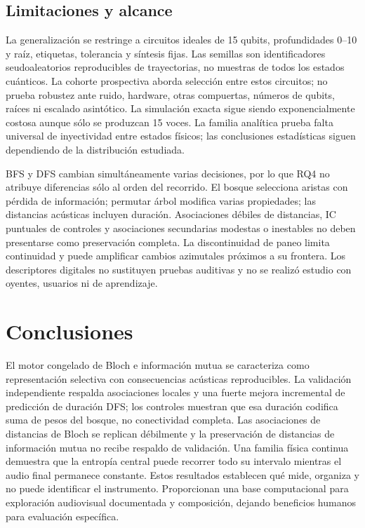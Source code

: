 \documentclass[pdflatex,iicol,sn-basic,Numbered]{sn-jnl}
\begin{document}
\subsection{Limitaciones y alcance}
La generalización se restringe a circuitos ideales de 15 qubits, profundidades 0--10 y raíz, etiquetas, tolerancia y síntesis fijas. Las semillas son identificadores seudoaleatorios reproducibles de trayectorias, no muestras de todos los estados cuánticos. La cohorte prospectiva aborda selección entre estos circuitos; no prueba robustez ante ruido, hardware, otras compuertas, números de qubits, raíces ni escalado asintótico. La simulación exacta sigue siendo exponencialmente costosa aunque sólo se produzcan 15 voces. La familia analítica prueba falta universal de inyectividad entre estados físicos; las conclusiones estadísticas siguen dependiendo de la distribución estudiada.

BFS y DFS cambian simultáneamente varias decisiones, por lo que RQ4 no atribuye diferencias sólo al orden del recorrido. El bosque selecciona aristas con pérdida de información; permutar árbol modifica varias propiedades; las distancias acústicas incluyen duración. Asociaciones débiles de distancias, IC puntuales de controles y asociaciones secundarias modestas o inestables no deben presentarse como preservación completa. La discontinuidad de paneo limita continuidad y puede amplificar cambios azimutales próximos a su frontera. Los descriptores digitales no sustituyen pruebas auditivas y no se realizó estudio con oyentes, usuarios ni de aprendizaje.

\section{Conclusiones}
El motor congelado de Bloch e información mutua se caracteriza como representación selectiva con consecuencias acústicas reproducibles. La validación independiente respalda asociaciones locales y una fuerte mejora incremental de predicción de duración DFS; los controles muestran que esa duración codifica suma de pesos del bosque, no conectividad completa. Las asociaciones de distancias de Bloch se replican débilmente y la preservación de distancias de información mutua no recibe respaldo de validación. Una familia física continua demuestra que la entropía central puede recorrer todo su intervalo mientras el audio final permanece constante. Estos resultados establecen qué mide, organiza y no puede identificar el instrumento. Proporcionan una base computacional para exploración audiovisual documentada y composición, dejando beneficios humanos para evaluación específica.
\end{document}
